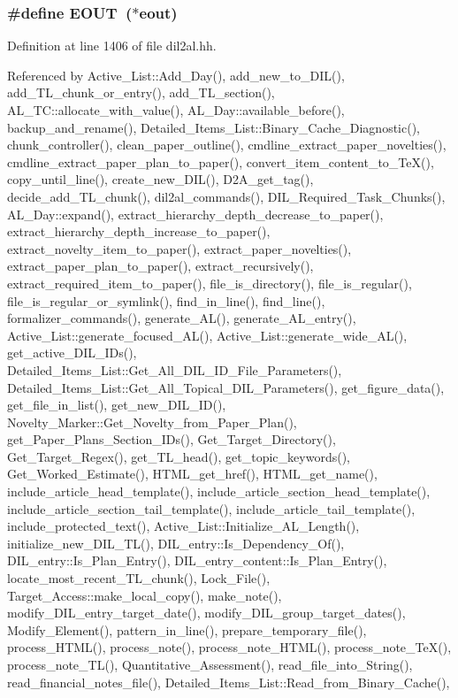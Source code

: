 \subsubsection{\setlength{\rightskip}{0pt plus 5cm}\#define EOUT\ ($\ast${\bf eout})}\label{dil2al_8hh_a107}




Definition at line 1406 of file dil2al.hh.

Referenced by Active\_\-List::Add\_\-Day(), add\_\-new\_\-to\_\-DIL(), add\_\-TL\_\-chunk\_\-or\_\-entry(), add\_\-TL\_\-section(), AL\_\-TC::allocate\_\-with\_\-value(), AL\_\-Day::available\_\-before(), backup\_\-and\_\-rename(), Detailed\_\-Items\_\-List::Binary\_\-Cache\_\-Diagnostic(), chunk\_\-controller(), clean\_\-paper\_\-outline(), cmdline\_\-extract\_\-paper\_\-novelties(), cmdline\_\-extract\_\-paper\_\-plan\_\-to\_\-paper(), convert\_\-item\_\-content\_\-to\_\-Te\-X(), copy\_\-until\_\-line(), create\_\-new\_\-DIL(), D2A\_\-get\_\-tag(), decide\_\-add\_\-TL\_\-chunk(), dil2al\_\-commands(), DIL\_\-Required\_\-Task\_\-Chunks(), AL\_\-Day::expand(), extract\_\-hierarchy\_\-depth\_\-decrease\_\-to\_\-paper(), extract\_\-hierarchy\_\-depth\_\-increase\_\-to\_\-paper(), extract\_\-novelty\_\-item\_\-to\_\-paper(), extract\_\-paper\_\-novelties(), extract\_\-paper\_\-plan\_\-to\_\-paper(), extract\_\-recursively(), extract\_\-required\_\-item\_\-to\_\-paper(), file\_\-is\_\-directory(), file\_\-is\_\-regular(), file\_\-is\_\-regular\_\-or\_\-symlink(), find\_\-in\_\-line(), find\_\-line(), formalizer\_\-commands(), generate\_\-AL(), generate\_\-AL\_\-entry(), Active\_\-List::generate\_\-focused\_\-AL(), Active\_\-List::generate\_\-wide\_\-AL(), get\_\-active\_\-DIL\_\-IDs(), Detailed\_\-Items\_\-List::Get\_\-All\_\-DIL\_\-ID\_\-File\_\-Parameters(), Detailed\_\-Items\_\-List::Get\_\-All\_\-Topical\_\-DIL\_\-Parameters(), get\_\-figure\_\-data(), get\_\-file\_\-in\_\-list(), get\_\-new\_\-DIL\_\-ID(), Novelty\_\-Marker::Get\_\-Novelty\_\-from\_\-Paper\_\-Plan(), get\_\-Paper\_\-Plans\_\-Section\_\-IDs(), Get\_\-Target\_\-Directory(), Get\_\-Target\_\-Regex(), get\_\-TL\_\-head(), get\_\-topic\_\-keywords(), Get\_\-Worked\_\-Estimate(), HTML\_\-get\_\-href(), HTML\_\-get\_\-name(), include\_\-article\_\-head\_\-template(), include\_\-article\_\-section\_\-head\_\-template(), include\_\-article\_\-section\_\-tail\_\-template(), include\_\-article\_\-tail\_\-template(), include\_\-protected\_\-text(), Active\_\-List::Initialize\_\-AL\_\-Length(), initialize\_\-new\_\-DIL\_\-TL(), DIL\_\-entry::Is\_\-Dependency\_\-Of(), DIL\_\-entry::Is\_\-Plan\_\-Entry(), DIL\_\-entry\_\-content::Is\_\-Plan\_\-Entry(), locate\_\-most\_\-recent\_\-TL\_\-chunk(), Lock\_\-File(), Target\_\-Access::make\_\-local\_\-copy(), make\_\-note(), modify\_\-DIL\_\-entry\_\-target\_\-date(), modify\_\-DIL\_\-group\_\-target\_\-dates(), Modify\_\-Element(), pattern\_\-in\_\-line(), prepare\_\-temporary\_\-file(), process\_\-HTML(), process\_\-note(), process\_\-note\_\-HTML(), process\_\-note\_\-Te\-X(), process\_\-note\_\-TL(), Quantitative\_\-Assessment(), read\_\-file\_\-into\_\-String(), read\_\-financial\_\-notes\_\-file(), Detailed\_\-Items\_\-List::Read\_\-from\_\-Binary\_\-Cache(), 